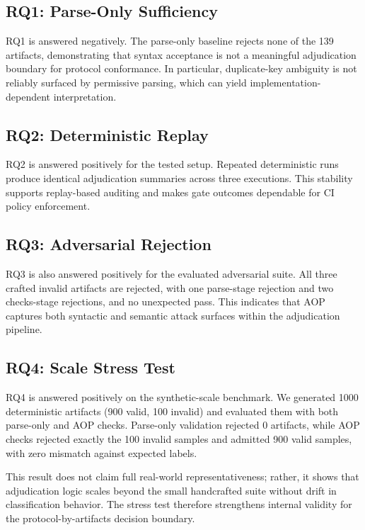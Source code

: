 \documentclass[10pt,conference]{IEEEtran}
\begin{document}


\subsection{RQ1: Parse-Only Sufficiency}

RQ1 is answered negatively. The parse-only baseline rejects none of the
139 artifacts, demonstrating that syntax acceptance is not a meaningful
adjudication boundary for protocol conformance. In particular,
duplicate-key ambiguity is not reliably surfaced by permissive parsing,
which can yield implementation-dependent interpretation.

\subsection{RQ2: Deterministic Replay}

RQ2 is answered positively for the tested setup. Repeated deterministic runs
produce identical adjudication summaries across three executions. This
stability supports replay-based auditing and makes gate outcomes dependable
for CI policy enforcement.

\subsection{RQ3: Adversarial Rejection}

RQ3 is also answered positively for the evaluated adversarial suite.
All three crafted invalid artifacts are rejected, with one parse-stage
rejection and two checks-stage rejections, and no unexpected pass. This
indicates that AOP captures both syntactic and semantic attack surfaces
within the adjudication pipeline.

\subsection{RQ4: Scale Stress Test}

RQ4 is answered positively on the synthetic-scale benchmark. We generated
1000 deterministic artifacts (900 valid, 100 invalid) and evaluated them with
both parse-only and AOP checks. Parse-only validation rejected 0 artifacts,
while AOP checks rejected exactly the 100 invalid samples and admitted 900
valid samples, with zero mismatch against expected labels.

This result does not claim full real-world representativeness; rather, it
shows that adjudication logic scales beyond the small handcrafted suite
without drift in classification behavior. The stress test therefore strengthens
internal validity for the protocol-by-artifacts decision boundary.
\end{document}
